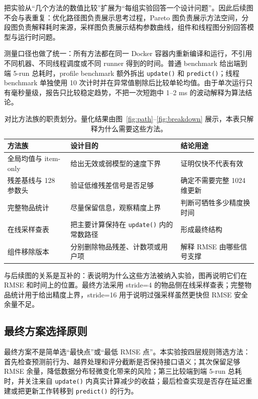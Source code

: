 \documentclass[UTF8,zihao=-4,scheme=plain]{ctexart}
\begin{document}
 把实验从“几个方法的数值比较”扩展为“每组实验回答一个设计问题”。因此后续图不会与表重复：优化路径图负责展示思考过程，Pareto 图负责展示方法空间，分段图负责解释耗时来源，采样图负责展示结构参数曲线，组件和线程图分别回答模型与运行时问题。

测量口径也做了统一：所有方法都在同一 Docker 容器内重新编译和运行，不引用不同机器、不同线程调度或不同 runner 得到的时间。普通 benchmark 给出端到端 5-run 总耗时，profile benchmark 额外拆出 \texttt{update()} 和 \texttt{predict()}；线程 benchmark 单独使用 10 次计时并在异常值剔除后比较单轮均值。由于单次运行只有毫秒量级，报告只比较稳定趋势，不把一次短跑中 1--2 ms 的波动解释为算法结论。

\begin{table}[H]
  \centering
  \caption{对比方法族的职责划分。量化结果由图~\ref{fig:path}--\ref{fig:breakdown} 展示，本表只解释为什么需要这些方法。}
  \label{tab:family}
  \small
  \begin{tabular}{lll}
    \toprule
    方法族 & 设计目的 & 结论用途\\
    \midrule
    全局均值与 item-only & 给出无效或弱模型的速度下界 & 证明仅快不代表有效\\
    残差基线与 128 参数头 & 验证低维残差信号是否足够 & 确定不需要完整 1024 维更新\\
    完整物品统计 & 尽量保留信息，观察精度上界 & 判断可牺牲多少精度换时间\\
    在线采样查表 & 把主要计算保持在 \texttt{update()} 内的常数路径 & 形成最终结构\\
    组件移除版本 & 分别删除物品残差、计数项或用户项 & 解释 RMSE 由哪些信号支撑\\
    \bottomrule
  \end{tabular}
\end{table}

 与后续图的关系是互补的：表说明为什么这些方法被纳入实验，图再说明它们在 RMSE 和时间上的位置。最终方法采用 stride=4 的物品侧在线采样查表；完整物品统计用于给出精度上界，stride=16 用于说明过强采样虽然更快但 RMSE 安全余量不足。

\subsection{最终方案选择原则}

最终方案不是简单选“最快点”或“最低 RMSE 点”。本实验按四层规则筛选方法：首先检查预测前行为、越界处理和评分截断是否保持接口语义；其次保留足够 RMSE 余量，降低数据分布轻微变化带来的风险；第三比较端到端 5-run 总耗时，并关注来自 \texttt{update()} 内真实计算减少的收益；最后检查实现是否存在延迟重建或把更新工作转移到 \texttt{predict()} 的行为。
\end{document}
